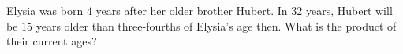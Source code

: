 Elysia was born $4$ years after her older brother Hubert. In $32$ years, Hubert will be $15$ years older than three-fourths of Elysia's age then. What is the product of their current ages?
